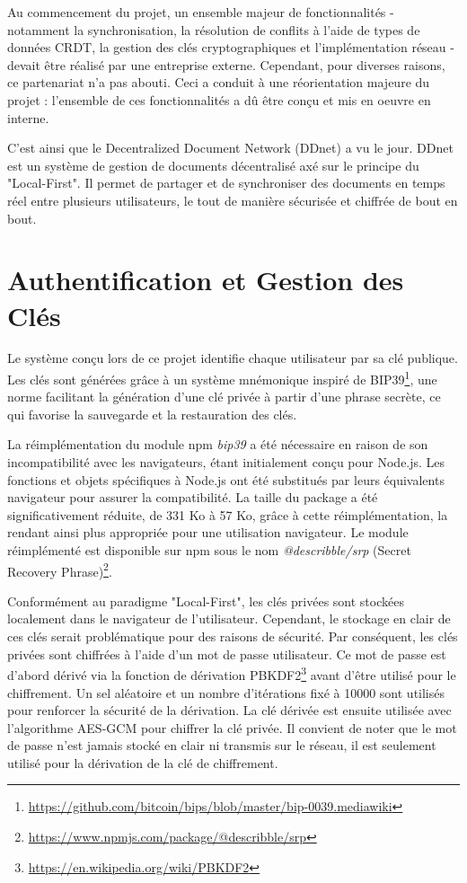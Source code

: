 Au commencement du projet, un ensemble majeur de fonctionnalités - notamment la synchronisation, la résolution de conflits à l'aide de types de données \Gls{CRDT}, la gestion des clés cryptographiques et l'implémentation réseau - devait être réalisé par une entreprise externe. Cependant, pour diverses raisons, ce partenariat n'a pas abouti. Ceci a conduit à une réorientation majeure du projet : l'ensemble de ces fonctionnalités a dû être conçu et mis en oeuvre en interne.

C'est ainsi que le Decentralized Document Network (DDnet) a vu le jour. \Gls{DDnet} est un système de gestion de documents décentralisé axé sur le principe du "Local-First". Il permet de partager et de synchroniser des documents en temps réel entre plusieurs utilisateurs, le tout de manière sécurisée et chiffrée de bout en bout.

\section{Authentification et Gestion des Clés}

Le système conçu lors de ce projet identifie chaque utilisateur par sa clé publique. Les clés sont générées grâce à un système mnémonique inspiré de BIP39\footnote{\url{https://github.com/bitcoin/bips/blob/master/bip-0039.mediawiki}}, une norme facilitant la génération d'une clé privée à partir d'une phrase secrète, ce qui favorise la sauvegarde et la restauration des clés.

La réimplémentation du module npm \textit{bip39} a été nécessaire en raison de son incompatibilité avec les navigateurs, étant initialement conçu pour Node.js. Les fonctions et objets spécifiques à Node.js ont été substitués par leurs équivalents navigateur pour assurer la compatibilité. La taille du package a été significativement réduite, de 331 Ko à 57 Ko, grâce à cette réimplémentation, la rendant ainsi plus appropriée pour une utilisation navigateur. Le module réimplémenté est disponible sur npm sous le nom \textit{@describble/srp} (Secret Recovery Phrase)\footnote{\url{https://www.npmjs.com/package/@describble/srp}}.

Conformément au paradigme "Local-First", les clés privées sont stockées localement dans le navigateur de l'utilisateur. Cependant, le stockage en clair de ces clés serait problématique pour des raisons de sécurité. Par conséquent, les clés privées sont chiffrées à l'aide d'un mot de passe utilisateur. Ce mot de passe est d'abord dérivé via la fonction de dérivation \Gls{PBKDF2}\footnote{\url{https://en.wikipedia.org/wiki/PBKDF2}} avant d'être utilisé pour le chiffrement. Un sel aléatoire et un nombre d'itérations fixé à 10000 sont utilisés pour renforcer la sécurité de la dérivation. La clé dérivée est ensuite utilisée avec l'algorithme AES-GCM pour chiffrer la clé privée. Il convient de noter que le mot de passe n'est jamais stocké en clair ni transmis sur le réseau, il est seulement utilisé pour la dérivation de la clé de chiffrement.

